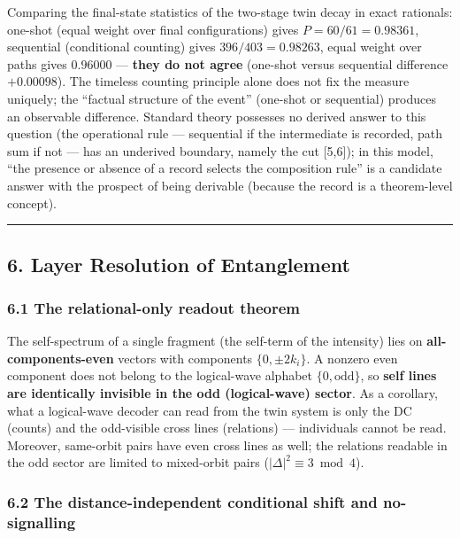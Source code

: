 \documentclass[
]{article}
\begin{document}
Comparing the final-state statistics of the two-stage twin decay in
exact rationals: one-shot (equal weight over final configurations) gives
\(P=60/61=0.98361\), sequential (conditional counting) gives
\(396/403=0.98263\), equal weight over paths gives \(0.96000\) ---
\textbf{they do not agree} (one-shot versus sequential difference
\(+0.00098\)). The timeless counting principle alone does not fix the
measure uniquely; the ``factual structure of the event'' (one-shot or
sequential) produces an observable difference. Standard theory possesses
no derived answer to this question (the operational rule --- sequential
if the intermediate is recorded, path sum if not --- has an underived
boundary, namely the cut {[}5,6{]}); in this model, ``the presence or
absence of a record selects the composition rule'' is a candidate answer
with the prospect of being derivable (because the record is a
theorem-level concept).

\begin{center}\rule{0.5\linewidth}{0.5pt}\end{center}

\subsection{6. Layer Resolution of
Entanglement}\label{layer-resolution-of-entanglement}

\subsubsection{6.1 The relational-only readout
theorem}\label{the-relational-only-readout-theorem}

The self-spectrum of a single fragment (the self-term of the intensity)
lies on \textbf{all-components-even} vectors with components
\(\{0,\pm2k_i\}\). A nonzero even component does not belong to the
logical-wave alphabet \(\{0,\mathrm{odd}\}\), so \textbf{self lines are
identically invisible in the odd (logical-wave) sector}. As a corollary,
what a logical-wave decoder can read from the twin system is only the DC
(counts) and the odd-visible cross lines (relations) --- individuals
cannot be read. Moreover, same-orbit pairs have even cross lines as
well; the relations readable in the odd sector are limited to
mixed-orbit pairs (\(|\Delta|^2\equiv3\bmod4\)).

\subsubsection{6.2 The distance-independent conditional shift and
no-signalling}\label{the-distance-independent-conditional-shift-and-no-signalling}
\end{document}

